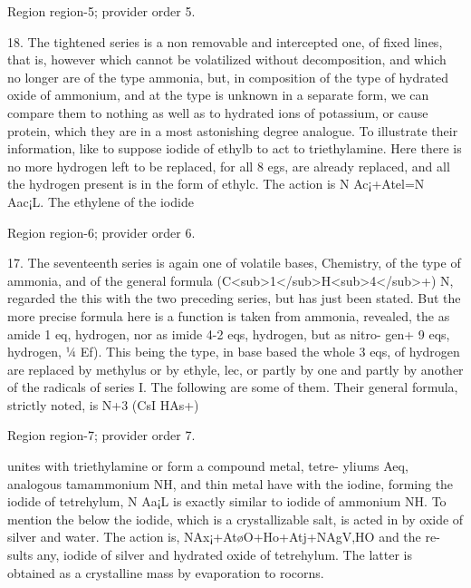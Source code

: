 \documentclass[11pt]{article}
\begin{document}
{\scriptsize\color{gray} Region region-5; provider order 5.\par}
\medskip

18. The tightened series is a non removable and intercepted one, of fixed lines, that is, however which cannot be volatilized without decomposition, and which no longer are of the type ammonia, but, in composition of the type of hydrated oxide of ammonium, and at the type is unknown in a separate form, we can compare them to nothing as well as to hydrated ions of potassium, or cause protein, which they are in a most astonishing degree analogue. To illustrate their information, like to suppose iodide of ethylb to act to triethylamine. Here there is no more hydrogen left to be replaced, for all 8 egs, are already replaced, and all the hydrogen present is in the form of ethylc. The action is N Ac¡+Atel=N Aac¡L. The ethylene of the iodide
\par

{\scriptsize\color{gray} Region region-6; provider order 6.\par}
\medskip

17. The seventeenth series is again one of volatile bases, Chemistry, of the type of ammonia, and of the general formula (C<sub>1</sub>H<sub>4</sub>+) N, regarded the this with the two preceding series, but has just been stated. But the more precise formula here is a function is taken from ammonia, revealed, the as amide 1 eq, hydrogen, nor as imide 4-2 eqs, hydrogen, but as nitro- gen+ 9 eqs, hydrogen, 1⁄4 Ef). This being the type, in base based the whole 3 eqs, of hydrogen are replaced by methylus or by ethyle, lec, or partly by one and partly by another of the radicals of series I. The following are some of them. Their general formula, strictly noted, is N+3 (CsI HAs+)
\par

{\scriptsize\color{gray} Region region-7; provider order 7.\par}
\medskip

unites with triethylamine or form a compound metal, tetre- yliums Aeq, analogous tamammonium NH, and thin metal have with the iodine, forming the iodide of tetrehylum, N Aa¡L is exactly similar to iodide of ammonium NH. To mention the below the iodide, which is a crystallizable salt, is acted in by oxide of silver and water. The action is, NAx¡+AtøO+Ho+Atj+NAgV,HO and the re- sults any, iodide of silver and hydrated oxide of tetrehylum. The latter is obtained as a crystalline mass by evaporation to rocorns.
\par
\end{document}
